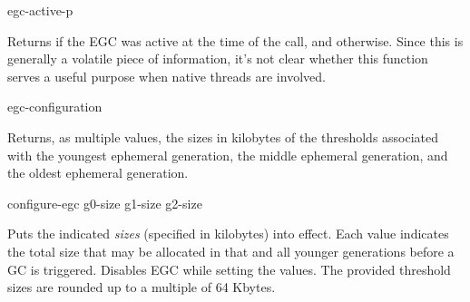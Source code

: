 \begin{defun}[Function]
egc-active-p

Returns  if the EGC was active at the time of the call, and
 otherwise. Since this is generally a volatile piece of
information, it's not clear whether this function serves a useful
purpose when native threads are involved.
\end{defun}

\begin{defun}[Function]
egc-configuration

Returns, as multiple values, the sizes in kilobytes of the thresholds
associated with the youngest ephemeral generation, the middle
ephemeral generation, and the oldest ephemeral generation.
\end{defun}

\begin{defun}[Function]
configure-egc g0-size g1-size g2-size

Puts the indicated {\it sizes} (specified in kilobytes) into effect.
Each value indicates the total size that may be allocated in that and
all younger generations before a GC is triggered.  Disables EGC while
setting the values.  The provided threshold sizes are rounded up to a
multiple of 64 Kbytes.
\end{defun}

